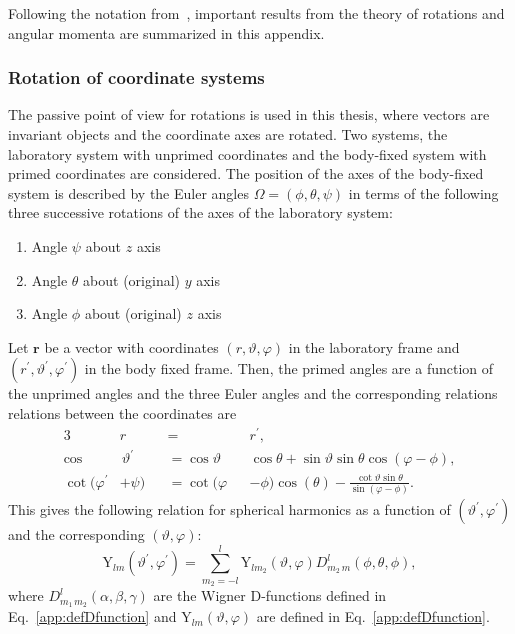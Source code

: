 Following the notation from~\cite{varshalovich1988}, important results from the theory of rotations and angular momenta are summarized in this appendix.
\subsubsection*{Rotation of coordinate systems}
The passive point of view for rotations is used in this thesis, where vectors are invariant objects and the coordinate axes are rotated. Two systems, the laboratory system with unprimed coordinates and the body-fixed system with primed coordinates are considered. The position of the axes of the body-fixed system is described by the Euler angles $\Omega=(\phi,\theta,\psi)$ in terms of the following three successive rotations of the axes of the laboratory system:
\begin{enumerate}
\item Angle $\psi$ about $z$ axis
\item Angle $\theta$ about (original) $y$ axis
\item Angle $\phi$ about (original) $z$ axis
\end{enumerate}
Let $\mathbf{r}$ be a vector with coordinates $(r,\vartheta,\varphi)$ in the laboratory frame and $(r^\prime,\vartheta^\prime,\varphi^\prime)$ in the body fixed frame. Then, the primed angles are a function of the unprimed angles and the three Euler angles and the corresponding relations relations between the coordinates are
\begin{alignat}{3}
& r &&= &&r^\prime,\\
\cos&\,\vartheta^\prime &&= \cos\vartheta && \cos\theta + \sin\vartheta\sin\theta\cos(\varphi-\phi),\\
\cot (\varphi^\prime &+ \psi) &&= \cot (\varphi &&- \phi)\cos(\theta)-\frac{\cot\vartheta \sin\theta}{\sin(\varphi-\phi)}.
\end{alignat}
This gives the following relation for spherical harmonics as a function of $(\vartheta^\prime,\varphi^\prime)$ and the corresponding $(\vartheta,\varphi)$:
\begin{equation}
\label{eq:rot_sphHarm}
\text{Y}_{lm}(\vartheta^\prime,\varphi^\prime)=\sum_{m_2=-l}^l \text{Y}_{lm_2}(\vartheta,\varphi) D^l_{m_2\,m}(\phi,\theta,\phi),
\end{equation}
where $D^l_{m_1\,m_2}(\alpha,\beta,\gamma)$ are the Wigner D-functions defined in Eq.~\eqref{app:defDfunction} and $\text{Y}_{lm}(\vartheta,\varphi)$ are defined in Eq.~\eqref{app:defDfunction}.

